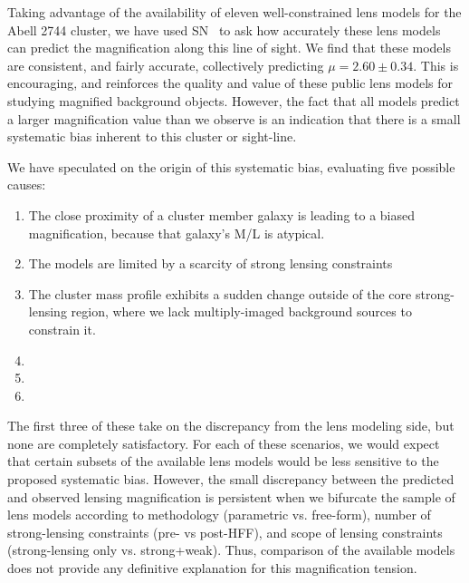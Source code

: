 Taking advantage of the availability of eleven well-constrained lens
models for the Abell 2744 cluster, we have used SN \tomas\ to ask
how accurately these lens models can predict the magnification along
this line of sight.   We find that these models are consistent, and
fairly accurate, collectively predicting $\mu=2.60\pm0.34$.  This is
encouraging, and reinforces the quality and value of these public lens
models for studying magnified background objects.   However, the fact
that all models predict a larger magnification value than we observe
is an indication that there is a small systematic bias inherent to
this cluster or sight-line. 

We have speculated on the origin of this systematic bias,
evaluating five possible causes: 

\begin{enumerate}
\item The close proximity of a cluster member galaxy is leading to a
biased magnification, because that galaxy's M/L is atypical.
\item The models are limited by a scarcity of strong lensing constraints
\item The cluster mass profile exhibits a sudden change outside of the core
strong-lensing region, where we lack multiply-imaged background
sources to constrain it. 
\item {}
\item {}
\item {}
\end{enumerate}

\noindent The first three of these take on the discrepancy from 
the lens modeling side, but none are completely satisfactory. For each
of these scenarios, we would expect that certain subsets of the
available lens models would be less sensitive to the proposed
systematic bias.  However, the small discrepancy between the predicted
and observed lensing magnification is persistent when we bifurcate the
sample of lens models according to methodology (parametric
vs. free-form), number of strong-lensing constraints (pre- vs
post-HFF), and scope of lensing constraints (strong-lensing only
vs. strong+weak). Thus, comparison of the available models does not
provide any definitive explanation for this magnification tension.


